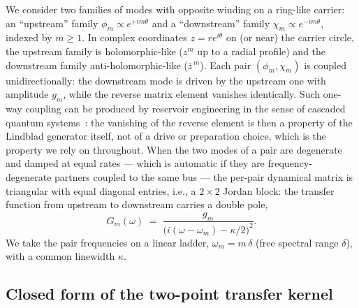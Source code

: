 \documentclass[11pt,a4paper]{article}
\newcommand{\zb}{\bar{z}}
\begin{document}
We consider two families of modes with opposite winding on a ring-like carrier:
an ``upstream'' family $\phi_m \propto e^{+i m \theta}$ and a ``downstream''
family $\chi_m \propto e^{-i m \theta}$, indexed by $m \geq 1$. In complex
coordinates $z = r e^{i\theta}$ on (or near) the carrier circle, the upstream
family is holomorphic-like ($z^m$ up to a radial profile) and the downstream
family anti-holomorphic-like ($\zb^{\,m}$). Each pair $(\phi_m, \chi_m)$ is coupled
unidirectionally: the downstream mode is driven by the upstream one with
amplitude $g_m$, while the reverse matrix element vanishes identically. Such
one-way coupling can be produced by reservoir engineering in the sense of
cascaded quantum systems~\cite{Gardiner1993,Carmichael1993,MetelmannClerk2015}:
the vanishing of the reverse element is then a
property of the Lindblad generator itself, not of a drive or preparation
choice, which is the property we rely on throughout. When the two modes of a
pair are degenerate and damped at equal rates --- which is automatic if they are
frequency-degenerate partners coupled to the same bus --- the per-pair dynamical
matrix is triangular with equal diagonal entries, i.e., a $2\times 2$ Jordan block: the
transfer function from upstream to downstream carries a double pole,
\begin{equation}
G_m(\omega) \;=\; \frac{g_m}{\bigl(i(\omega - \omega_m) - \kappa/2\bigr)^{2}}.
\end{equation}
We take the pair frequencies on a linear ladder, $\omega_m = m\,\delta$ (free
spectral range $\delta$), with a common linewidth $\kappa$.

\subsection{Closed form of the two-point transfer kernel}
\label{sec:closedform}
\end{document}
